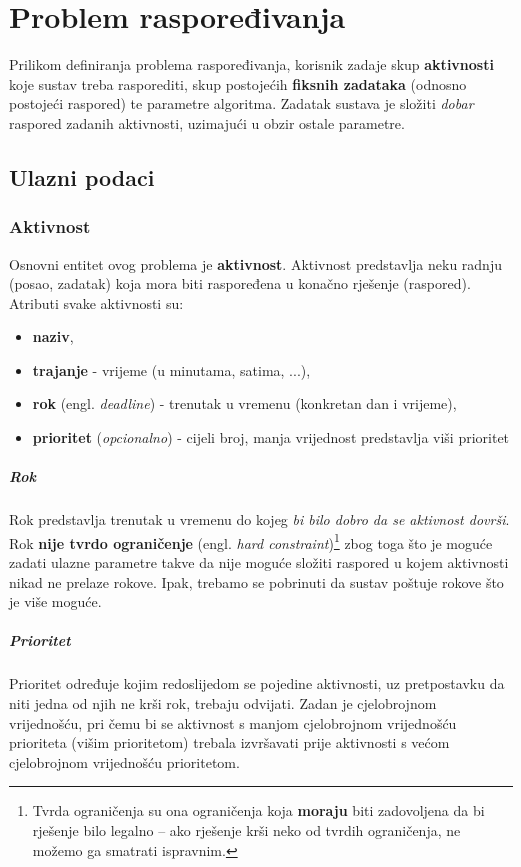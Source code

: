 \documentclass[times, utf8, zavrsni]{fer}
\begin{document}
\chapter{Problem raspoređivanja}\label{definicija}
Prilikom definiranja problema raspoređivanja, korisnik zadaje skup \textbf{aktivnosti} koje sustav treba rasporediti, skup postojećih \textbf{fiksnih zadataka} (odnosno postojeći raspored) te parametre algoritma. Zadatak sustava je složiti \textit{dobar} raspored zadanih aktivnosti, uzimajući u obzir ostale parametre.

\section{Ulazni podaci}\label{ulazni podaci}

\subsection{Aktivnost}
Osnovni entitet ovog problema je \textbf{aktivnost}. Aktivnost predstavlja neku radnju (posao, zadatak) koja mora biti raspoređena u konačno rješenje (raspored). Atributi svake aktivnosti su:
\begin{itemize}
  \item \textbf{naziv},
  \item \textbf{trajanje} - vrijeme (u minutama, satima, ...),
  \item \textbf{rok} (engl. \textit{deadline}) - trenutak u vremenu (konkretan dan i vrijeme),
  \item \textbf{prioritet} (\textit{opcionalno}) - cijeli broj, manja vrijednost predstavlja viši prioritet
\end{itemize}

\paragraph{Rok} Rok predstavlja trenutak u vremenu do kojeg \textit{bi bilo dobro da se aktivnost dovrši}. Rok \textbf{nije tvrdo ograničenje} (engl. \textit{hard constraint})\footnote{Tvrda ograničenja su ona ograničenja koja \textbf{moraju} biti zadovoljena da bi rješenje bilo legalno -- ako rješenje krši neko od tvrdih ograničenja, ne možemo ga smatrati ispravnim.} zbog toga što je moguće zadati ulazne parametre takve da nije moguće složiti raspored u kojem aktivnosti nikad ne prelaze rokove. Ipak, trebamo se pobrinuti da sustav poštuje rokove što je više moguće.

\paragraph{Prioritet} Prioritet određuje kojim redoslijedom se pojedine aktivnosti, uz pretpostavku da niti jedna od njih ne krši rok, trebaju odvijati. Zadan je cjelobrojnom vrijednošću, pri čemu bi se aktivnost s manjom cjelobrojnom vrijednošću prioriteta (višim prioritetom) trebala izvršavati prije aktivnosti s većom cjelobrojnom vrijednošću prioritetom.
\end{document}
